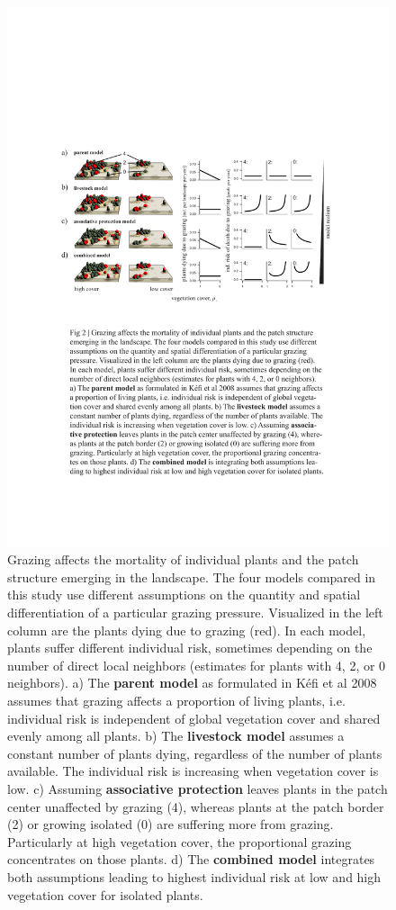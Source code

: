 \begin{figure}[!tp]
	\centering
		\includegraphics{figures/fig2.pdf}
	\caption{Grazing affects the mortality of individual plants and the patch structure emerging in the landscape. The four models compared in this study use different assumptions on the quantity and spatial differentiation of a particular grazing pressure. Visualized in the left column are the plants dying due to grazing (red). In each model, plants suffer different individual risk, sometimes depending on the number of direct local neighbors (estimates for plants with 4, 2, or 0 neighbors).  a) The \textbf{parent model} as formulated in Kéfi et al 2008 assumes that grazing affects a proportion of living plants, i.e. individual risk is independent of global vegetation cover and shared evenly among all plants. b) The \textbf{livestock model} assumes a constant number of plants dying, regardless of the number of plants available. The individual risk is increasing when vegetation cover is low. c) Assuming \textbf{associative protection} leaves plants in the patch center unaffected by grazing (4), where­as plants at the patch border (2) or growing isolated (0) are suffering more from grazing. Particularly at high vegetation cover, the proportional grazing concentrates on those plants. d) The \textbf{combined model} integrates both assumptions leading to highest individual risk at low and high vegetation cover for isolated plants.  }
	\label{fig:fig2}
\end{figure}

